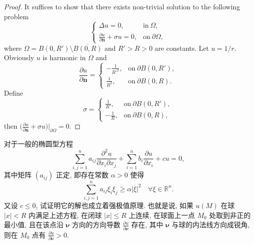 \begin{proof}
  It suffices to show that there exists non-trivial solution to the following problem
  \[\begin{cases}
    \Delta u = 0, & \text{in}\ \varOmega, \\
    \frac{\partial u}{\partial \bm{n}}+\sigma u = 0, & \text{on}\ \partial\varOmega,
  \end{cases}\]
  where $\varOmega = B(0,R')\setminus\overline{B(0,R)}$ and $R'>R>0$ are constants.
  Let $u = 1/r$. Obviously $u$ is harmonic in $\varOmega$ and
  \[\frac{\partial u}{\partial \bm{n}} =
  \begin{cases}
     -\frac{1}{R'^2}, & \text{on}\ \partial B(0,R'), \\
     \frac{1}{R^2}, & \text{on}\ \partial B(0,R).
  \end{cases}\]
  Define
  \[ \sigma = \begin{cases}
    \frac{1}{R'}, & \text{on}\ \partial B(0,R'), \\
    -\frac{1}{R}, & \text{on}\ \partial B(0,R),
  \end{cases}\]
  then $\bigl(\frac{\partial u}{\partial \bm{n}}+\sigma u\bigr)\big|_{\partial\varOmega} = 0$.
\end{proof}


\begin{exercise}[6]
  对于一般的椭圆型方程
  \[\sum_{i,j=1}^n a_{ij}\frac{\partial^2u}{\partial x_i\partial x_j}
    + \sum_{i=1}^n b_i \frac{\partial u}{\partial x_i} + cu = 0,\]
  其中矩阵 $(a_{ij})$ 正定, 即存在常数 $\alpha>0$ 使得
  \[\sum_{i,j=1}^n a_{ij}\xi_i\xi_j \geq \alpha|\xi|^2\quad
    \forall\xi\in \mathbb{R}^n.\]
  又设 $c\leq 0$, 试证明它的解也成立着强极值原理.
  也就是说, 如果 $u(M)$ 在球 $|x|<R$ 内满足上述方程, 在闭球 $|x|\leq R$ 上连续,
  在球面上一点 $M_0$ 处取到非正的最小值, 且在该点沿 $\bm{\nu}$ 方向的方向导数
  $\frac{\partial u}{\partial \bm{\nu}}$ 存在, 其中 $\bm{\nu}$ 与球的内法线方向成锐角,
  则在 $M_0$ 点有 $\frac{\partial u}{\partial \bm{\nu}}>0$.
\end{exercise}

